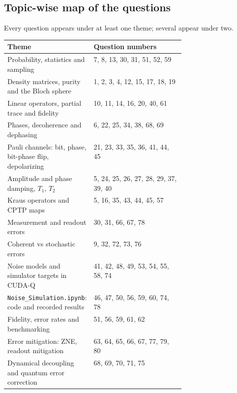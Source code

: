 \documentclass[11pt,a4paper]{article}
\begin{document}
\subsection*{Topic-wise map of the questions}\label{topicmap}
{\small Every question appears under at least one theme; several appear under two.\par}
{\small\renewcommand{\arraystretch}{1.2}
\begin{tabularx}{\linewidth}{@{}>{\raggedright\arraybackslash}p{0.42\linewidth}L@{}}
\toprule
\textbf{Theme} & \textbf{Question numbers}\\ \midrule
Probability, statistics and sampling & 7, 8, 13, 30, 31, 51, 52, 59 \\
Density matrices, purity and the Bloch sphere & 1, 2, 3, 4, 12, 15, 17, 18, 19 \\
Linear operators, partial trace and fidelity & 10, 11, 14, 16, 20, 40, 61 \\
Phases, decoherence and dephasing & 6, 22, 25, 34, 38, 68, 69 \\
Pauli channels: bit, phase, bit-phase flip, depolarizing & 21, 23, 33, 35, 36, 41, 44, 45 \\
Amplitude and phase damping, $T_1$, $T_2$ & 5, 24, 25, 26, 27, 28, 29, 37, 39, 40 \\
Kraus operators and CPTP maps & 5, 16, 35, 43, 44, 45, 57 \\
Measurement and readout errors & 30, 31, 66, 67, 78 \\
Coherent vs stochastic errors & 9, 32, 72, 73, 76 \\
Noise models and simulator targets in CUDA-Q & 41, 42, 48, 49, 53, 54, 55, 58, 74 \\
\texttt{Noise\_Simulation.ipynb}: code and recorded results & 46, 47, 50, 56, 59, 60, 74, 78 \\
Fidelity, error rates and benchmarking & 51, 56, 59, 61, 62 \\
Error mitigation: ZNE, readout mitigation & 63, 64, 65, 66, 67, 77, 79, 80 \\
Dynamical decoupling and quantum error correction & 68, 69, 70, 71, 75 \\
\bottomrule
\end{tabularx}}
\end{document}
